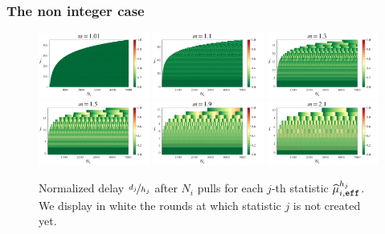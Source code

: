 \subsubsection{The non integer case}
\begin{figure}[ht]
\centering
\includegraphics[clip, width= 0.325\textwidth]{3Rested/fig/T=5000_m=1,01.pdf}
\includegraphics[clip, width= 0.325\textwidth]{3Rested/fig/T=5000_m=1,1.pdf}
\includegraphics[clip, width= 0.325\textwidth]{3Rested/fig/T=5000_m=1,3.pdf}
\includegraphics[clip, width= 0.325\textwidth]{3Rested/fig/T=5000_m=1,5.pdf}
\includegraphics[clip, width= 0.325\textwidth]{3Rested/fig/T=5000_m=1,9.pdf}
\includegraphics[clip, width= 0.325\textwidth]{3Rested/fig/T=5000_m=2,1.pdf}
\caption{Normalized delay $\nicefrac{d_j}{h_j}$ after $N_i$ pulls for each $j$-th statistic $\widehat{\mu}_{i,\texttt{\footnotesize{eff}}}^{h_j}$. We display in white the rounds at which statistic $j$ is not created yet.}
\label{fig:delay-general}
\end{figure}

